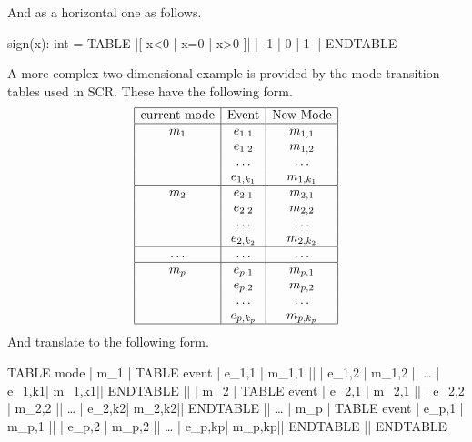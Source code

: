 And as a horizontal one as follows.
\begin{pvsex}
  sign(x): int = TABLE 
                 |[ x<0 | x=0 | x>0 ]|
                 |   -1 |  0  |  1  ||
   ENDTABLE
\end{pvsex}


A more complex two-dimensional example is provided by the mode
transition tables used in SCR\@.  These have the following form.
\[
\begin{array}{|c|c|c|}
\hline
\mbox{current mode} & \mbox{Event} & \mbox{New Mode} \\
\hline
m_{1} & e_{1,1} & m_{1,1} \\
    & e_{1,2} & m_{1,2} \\
    & \ldots & \ldots\\
    & e_{1,k_1} & m_{1,k_1} \\
\hline
m_{2} & e_{2,1} & m_{2,1} \\
    & e_{2,2} & m_{2,2} \\
    & \ldots & \ldots\\
    & e_{2,k_2} & m_{2,k_2} \\
\hline
\ldots  & \ldots & \ldots\\  
\hline
m_{p} & e_{p,1} & m_{p,1} \\
    & e_{p,2} & m_{p,2} \\
    & \ldots & \ldots\\
    & e_{p,k_p} & m_{p,k_p} \\
\hline
\end{array}
\]
And translate to the following form.
\smaller
\begin{center}
\begin{pvsex}
TABLE mode
     |  m\_1 | TABLE event
                  | e\_1,1 | m\_1,1 ||
                  | e\_1,2 | m\_1,2 ||
           \ldots
                  | e\_1,k1| m\_1,k1||
             ENDTABLE ||
     |  m\_2 | TABLE event
                  | e\_2,1 | m\_2,1 ||
                  | e\_2,2 | m\_2,2 ||
           \ldots
                  | e\_2,k2| m\_2,k2||
             ENDTABLE ||
        \ldots
     |  m\_p | TABLE event
                  | e\_p,1 | m\_p,1 ||
                  | e\_p,2 | m\_p,2 ||
           \ldots
                  | e\_p,kp| m\_p,kp||
             ENDTABLE ||
ENDTABLE
\end{pvsex}
\end{center}

